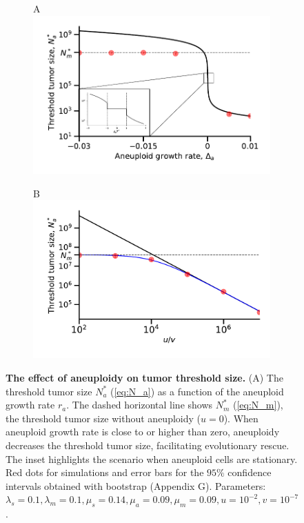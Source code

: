 \documentclass[12pt]{extarticle}
\renewcommand{\Delta}{r}
\begin{document}
\begin{figure}
\begin{subfigure}{0.5\textwidth}
A\\
\includegraphics[width=1\textwidth]{Figures/ThresholdPopulationSizePlot.pdf}
\end{subfigure}
\begin{subfigure}{0.5\textwidth}
B\\
\includegraphics[width=1\textwidth]{Figures/ThresholdPopulationSizeVersusRatioPlot.pdf}
\end{subfigure}
\caption{
\textbf{The effect of aneuploidy on tumor threshold size.}
(A) The threshold tumor size $N_a^*$ (\cref{eq:N_a}) as a function of the aneuploid growth rate $\Delta_a$. The dashed horizontal line shows $N^*_m$ (\cref{eq:N_m}), the threshold tumor size without aneuploidy ($u=0$).  When aneuploid growth rate is close to or higher than zero, aneuploidy decreases the threshold tumor size, facilitating evolutionary rescue. The inset highlights the scenario when aneuploid cells are stationary. Red dots for simulations and error bars for the $95\%$ confidence intervals obtained with bootstrap (Appendix G). Parameters: $\lambda_s=0.1,\lambda_m=0.1,\mu_s=0.14,\mu_a=0.09,\mu_m=0.09, u=10^{-2}, v=10^{-7}$. %
}
\end{figure}
\end{document}
